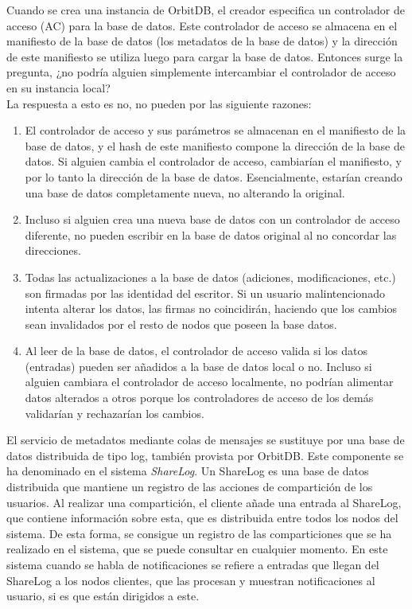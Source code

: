 Cuando se crea una instancia de OrbitDB, el creador especifica un controlador de acceso (AC) para la base de datos.
Este controlador de acceso se almacena en el manifiesto de la base de datos (los metadatos de la base de datos)
y la dirección de este manifiesto se utiliza luego para cargar la base de datos. Entonces surge la pregunta, ¿no podría alguien simplemente intercambiar el controlador de acceso en su instancia local?
\\
La respuesta a esto es no, no pueden por las siguiente razones:
\begin{enumerate}[noitemsep,after=\vspace{-0.4\baselineskip}]
  \item El controlador de acceso y sus parámetros se almacenan en el manifiesto de la base de datos, y el hash de este manifiesto compone la dirección de la base de datos. Si alguien cambia el controlador de acceso, cambiarían el manifiesto, y por lo tanto la dirección de la base de datos. Esencialmente, estarían creando una base de datos completamente nueva, no alterando la original.
  \item Incluso si alguien crea una nueva base de datos con un controlador de acceso diferente, no pueden escribir en la base de datos original al no concordar las direcciones.
  \item Todas las actualizaciones a la base de datos (adiciones, modificaciones, etc.) son firmadas por las identidad del escritor. Si un usuario malintencionado intenta alterar los datos, las firmas no coincidirán, haciendo que los cambios sean invalidados por el resto de nodos que poseen la base datos.
  \item Al leer de la base de datos, el controlador de acceso valida si los datos (entradas) pueden ser añadidos a la base de datos local o no. Incluso si alguien cambiara el controlador de acceso localmente, no podrían alimentar datos alterados a otros porque los controladores de acceso de los demás validarían y rechazarían los cambios.
\end{enumerate}


El servicio de metadatos mediante colas de mensajes se sustituye por una base de datos distribuida de tipo
log, también provista por OrbitDB. Este componente se ha denominado en el sistema \textit{ShareLog}.
Un ShareLog es una base de datos distribuida que mantiene un registro de las acciones de compartición de los usuarios. Al realizar una compartición, el cliente añade una entrada al ShareLog, que contiene información sobre esta, que es distribuida entre todos los nodos del sistema. De esta forma, se consigue un registro de las comparticiones que se ha realizado en el sistema, que se puede consultar en cualquier momento. En este sistema cuando se habla
de notificaciones se refiere a entradas que llegan del ShareLog a los nodos clientes, que las procesan y muestran notificaciones al usuario, si es que están dirigidos a este.

